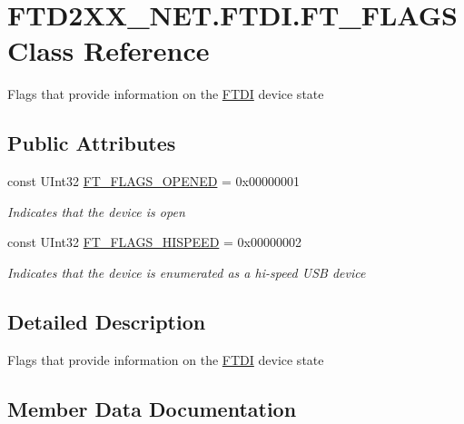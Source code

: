 \hypertarget{class_f_t_d2_x_x___n_e_t_1_1_f_t_d_i_1_1_f_t___f_l_a_g_s}{}\section{F\+T\+D2\+X\+X\+\_\+\+N\+E\+T.\+F\+T\+D\+I.\+F\+T\+\_\+\+F\+L\+A\+GS Class Reference}
\label{class_f_t_d2_x_x___n_e_t_1_1_f_t_d_i_1_1_f_t___f_l_a_g_s}


Flags that provide information on the \mbox{\hyperlink{class_f_t_d2_x_x___n_e_t_1_1_f_t_d_i}{F\+T\+DI}} device state  


\subsection*{Public Attributes}
\begin{DoxyCompactItemize}
\item 
const U\+Int32 \mbox{\hyperlink{class_f_t_d2_x_x___n_e_t_1_1_f_t_d_i_1_1_f_t___f_l_a_g_s_ab0105ad1e89f0ed8e5551d0fd58e5e9c}{F\+T\+\_\+\+F\+L\+A\+G\+S\+\_\+\+O\+P\+E\+N\+ED}} = 0x00000001
\begin{DoxyCompactList}\small\item\em Indicates that the device is open \end{DoxyCompactList}\item 
const U\+Int32 \mbox{\hyperlink{class_f_t_d2_x_x___n_e_t_1_1_f_t_d_i_1_1_f_t___f_l_a_g_s_aa9490c64d2ef7565614304420fc3fe6f}{F\+T\+\_\+\+F\+L\+A\+G\+S\+\_\+\+H\+I\+S\+P\+E\+ED}} = 0x00000002
\begin{DoxyCompactList}\small\item\em Indicates that the device is enumerated as a hi-\/speed U\+SB device \end{DoxyCompactList}\end{DoxyCompactItemize}


\subsection{Detailed Description}
Flags that provide information on the \mbox{\hyperlink{class_f_t_d2_x_x___n_e_t_1_1_f_t_d_i}{F\+T\+DI}} device state 



\subsection{Member Data Documentation}
\mbox{\label{class_f_t_d2_x_x___n_e_t_1_1_f_t_d_i_1_1_f_t___f_l_a_g_s_aa9490c64d2ef7565614304420fc3fe6f}} 
